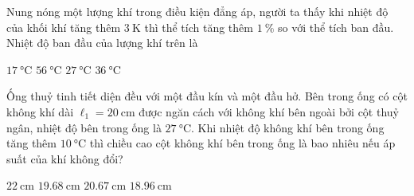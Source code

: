 \begin{ex}
	Nung nóng một lượng khí trong điều kiện đẳng áp, người ta thấy  khi nhiệt độ của khối khí tăng thêm $\SI{3}{\kelvin}$ thì thể tích tăng thêm $\SI{1}{\percent}$ so với thể tích ban đầu. Nhiệt độ ban đầu của lượng khí trên là
	
	\choice
	{$\SI{17}{\celsius}$}
	{$\SI{56}{\celsius}$}
	{\True $\SI{27}{\celsius}$}
	{$\SI{36}{\celsius}$}
\end{ex}
\begin{ex}
	Ống thuỷ tinh tiết diện đều với một đầu kín và một đầu hở. Bên trong ống có cột không khí dài $\ell_1=\SI{20}{\centi\meter}$ được ngăn cách với không khí bên ngoài bởi cột thuỷ ngân, nhiệt độ bên trong ống là $\SI{27}{\celsius}$. Khi nhiệt độ không khí bên trong ống tăng thêm $\SI{10}{\celsius}$ thì chiều cao cột không khí bên trong ống là bao nhiêu nếu áp suất của khí không đổi?
	
	\choice
	{$\SI{22}{\centi\meter}$}
	{$\SI{19.68}{\centi\meter}$}
	{\True $\SI{20.67}{\centi\meter}$}
	{$\SI{18.96}{\centi\meter}$}
\end{ex}
